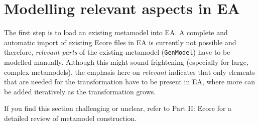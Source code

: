 \section{Modelling relevant aspects in EA}
\genHeader

The first step is to load an existing metamodel into EA. A complete and automatic import of existing Ecore files in EA is currently not possible and therefore,
\emph{relevant parts} of the existing metamodel (\texttt{GenModel}) have to be modelled manually. Although this might sound frightening (especially for
large, complex metamodels), the emphasis here on \emph{relevant} indicates that only elements that are needed for the transformation have to be present in
EA, where more can be added iteratively as the transformation grows. 

If you find this section challenging or unclear, refer to Part II: Ecore for a detailed review of metamodel construction.

